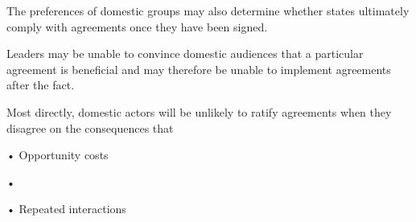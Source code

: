 The preferences of domestic groups may also determine whether states ultimately comply with agreements once they have been signed. 















Leaders may be unable to convince domestic audiences that a particular agreement is beneficial and may therefore be unable to implement agreements after the fact.	






























Most directly, domestic actors will be unlikely to ratify agreements when they disagree on the consequences that















•	Opportunity costs







•	







•	Repeated interactions







